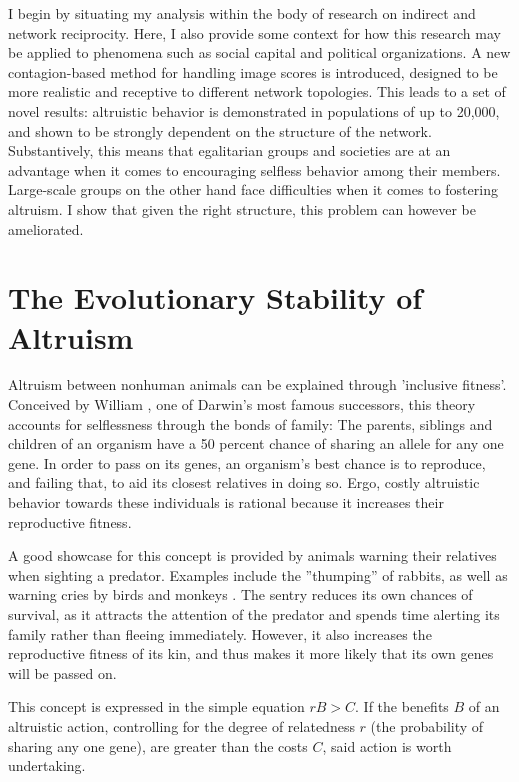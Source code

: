 \documentclass[12pt]{article}
\begin{document}
I begin by situating my analysis within the body of research on indirect and network reciprocity. Here, I also provide some context for how this research may be applied to phenomena such as social capital and political organizations. A new contagion-based method for handling image scores is introduced, designed to be more realistic and receptive to different network topologies. This leads to a set of novel results: altruistic behavior is demonstrated in populations of up to 20,000, and shown to be strongly dependent on the structure of the network. Substantively, this means that egalitarian groups and societies are at an advantage when it comes to encouraging selfless behavior among their members. Large-scale groups on the other hand face difficulties when it comes to fostering altruism. I show that given the right structure, this problem can however be ameliorated.

\section*{The Evolutionary Stability of Altruism}
Altruism between nonhuman animals can be explained through 'inclusive fitness'. Conceived by William \cite{Hamilton1964}, one of Darwin's most famous successors, this theory accounts for selflessness through the bonds of family: The parents, siblings and children of an organism have a 50 percent chance of sharing an allele for any one gene. In order to pass on its genes, an organism's best chance is to reproduce, and failing that, to aid its closest relatives in doing so. Ergo, costly altruistic behavior towards these individuals is rational because it increases their reproductive fitness.

A good showcase for this concept is provided by animals warning their relatives when sighting a predator. Examples include the ''thumping'' of rabbits, as well as warning cries by birds and monkeys \citep{hamilton1964_2}. The sentry reduces its own chances of survival, as it attracts the attention of the predator and spends time alerting its family rather than fleeing immediately. However, it also increases the reproductive fitness of its kin, and thus makes it more likely that its own genes will be passed on.

This concept is expressed in the simple equation $rB > C$. If the benefits $B$ of an altruistic action, controlling for the degree of relatedness $r$ (the probability of sharing any one gene), are greater than the costs $C$, said action is worth undertaking.
\end{document}
